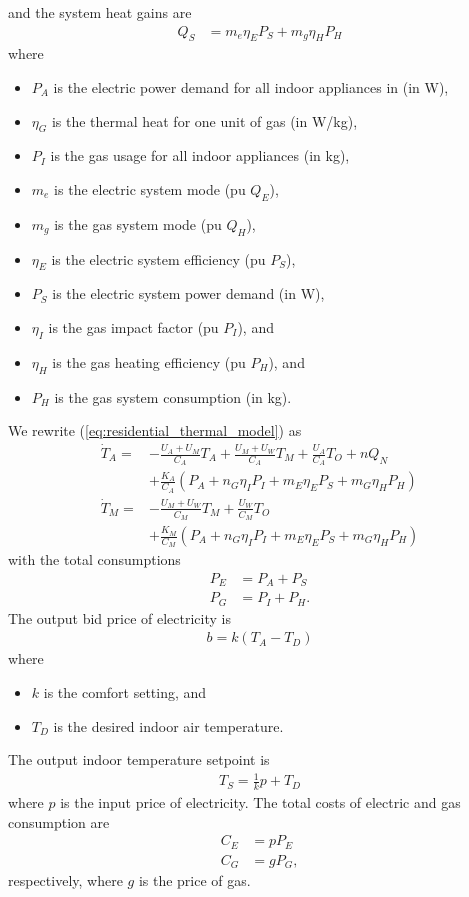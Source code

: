 \documentclass[12pt,letterpaper,twoside]{article}
\newcommand{\eq}[1]{\begin{align*}#1\end{align*}}
\newcommand{\eqn}[2]{\begin{align}\label{eq:#1}#2\end{align}}
\newcommand{\subeqn}[2]{\begin{subequations}\eqn{#1}{#2}\end{subequations}}
\begin{document}
and the system heat gains are
\eq 
{
	Q_S &= m_e \eta_E P_S  + m_g \eta_H P_H
}
where
\begin{itemize}

\item $P_A$ is the electric power demand for all indoor appliances in (in W),

\item $\eta_G$ is the thermal heat for one unit of gas (in W/kg),

\item $P_I$ is the gas usage for all indoor appliances (in kg),

\item $m_e$ is the electric system mode (pu $Q_E$),

\item $m_g$ is the gas system mode (pu $Q_H$),

\item $\eta_E$ is the electric system efficiency (pu $P_S$),

\item $P_S$ is the electric system power demand (in W),

\item $\eta_I$ is the gas impact factor (pu $P_I$), and

\item $\eta_H$ is the gas heating efficiency (pu $P_H$), and

\item $P_H$ is the gas system consumption (in kg).

\end{itemize}
We rewrite (\ref{eq:residential_thermal_model}) as
\subeqn {residentialmodel} 
{
	\dot T_A = & -\frac{U_A+U_M}{C_A} T_A + \frac{U_M+U_W}{C_A} T_M + \frac{U_A}{C_A} T_O + nQ_N
		\\ & + \frac{K_A}{C_A}(P_A+n_G\eta_IP_I+m_E\eta_EP_S+m_G\eta_HP_H)
\\
	\dot T_M = & -\frac{U_M+U_W}{C_M} T_M + \frac{U_W}{C_M} T_O 
		\\ & + \frac{K_M}{C_M}(P_A+n_G\eta_IP_I+m_E\eta_EP_S+m_G\eta_HP_H)
}
with the total consumptions
\subeqn {residentialuse} 
{
	P_E &= P_A + P_S
\\
	P_G &= P_I + P_H.
}
The output bid price of electricity is 
\eq {
	b = k (T_A-T_D)
}
where 
\begin{itemize}
\item $k$ is the comfort setting, and 
\item $T_D$ is the desired indoor air temperature.
\end{itemize}
The output indoor temperature setpoint is
\eq {
	T_S = \frac{1}{k} p + T_D
}
where $p$ is the input price of electricity. The total costs of electric and gas consumption are
\subeqn {residentialcost}
{
	C_E &= p P_E
\\
	C_G &= g P_G,
}
respectively, where $g$ is the price of gas.
\end{document}
